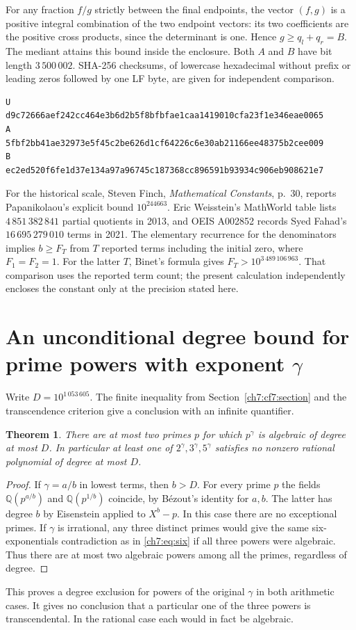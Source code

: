 \documentclass[11pt,a4paper,oneside,openany]{report}
\newtheorem{theorem}{Theorem}[section]
\theoremstyle{remark}\newtheorem{remark}[theorem]{Remark}
\numberwithin{equation}{section}
\begin{document}
For any fraction $f/g$ strictly between the final endpoints, the vector
$(f,g)$ is a positive integral combination of the two endpoint vectors:
its two coefficients are the positive cross products, since the
determinant is one. Hence $g\ge q_l+q_r=B$. The mediant attains
this bound inside the enclosure. Both $A$ and $B$ have bit length
$3\,500\,002$. SHA-256 checksums, of lowercase hexadecimal without
prefix or leading zeros followed by one LF byte, are given for
independent comparison.
\begin{verbatim}
U
d9c72666aef242cc464e3b6d2b5f8bfbfae1caa1419010cfa23f1e346eae0065
A
5fbf2bb41ae32973e5f45c2be626d1cf64226c6e30ab21166ee48375b2cee009
B
ec2ed520f6fe1d37e134a97a96745c187368cc896591b93934c906eb908621e7
\end{verbatim}

For the historical scale, Steven Finch, \emph{Mathematical Constants},
p.~30, reports Papanikolaou's explicit bound $10^{244663}$. Eric
Weisstein's MathWorld table lists $4\,851\,382\,841$ partial quotients
in 2013, and OEIS A002852 \cite{oeis-gamma} records Syed Fahad's $16\,695\,279\,010$
terms in 2021. The elementary recurrence for the denominators implies
$b\ge F_T$ from $T$ reported terms including the initial zero, where
$F_1=F_2=1$. For the latter $T$, Binet's formula gives
$F_T>10^{3\,489\,106\,963}$. That comparison uses the reported term
count; the present calculation independently encloses the constant
only at the precision stated here.

\section{An unconditional degree bound for prime powers with exponent \texorpdfstring{$\gamma$}{gamma}}
Write $D=10^{1\,053\,605}$. The finite inequality from Section~\ref{ch7:cf7:section} and the transcendence criterion give a conclusion with an infinite quantifier.
\begin{theorem}\label{ch7:t:degree}
There are at most two primes $p$ for which $p^\gamma$ is algebraic of degree at most $D$. In particular at least one of $2^\gamma,3^\gamma,5^\gamma$ satisfies no nonzero rational polynomial of degree at most $D$.
\end{theorem}
\begin{proof}
If $\gamma=a/b$ in lowest terms, then $b>D$. For every prime $p$ the fields $\mathbb Q(p^{a/b})$ and $\mathbb Q(p^{1/b})$ coincide, by B\'ezout's identity for $a,b$. The latter has degree $b$ by Eisenstein applied to $X^b-p$. In this case there are no exceptional primes. If $\gamma$ is irrational, any three distinct primes would give the same six-exponentials contradiction as in \eqref{ch7:eq:six} if all three powers were algebraic. Thus there are at most two algebraic powers among all the primes, regardless of degree.
\end{proof}
This proves a degree exclusion for powers of the original $\gamma$ in both arithmetic cases. It gives no conclusion that a particular one of the three powers is transcendental. In the rational case each would in fact be algebraic.
\end{document}
